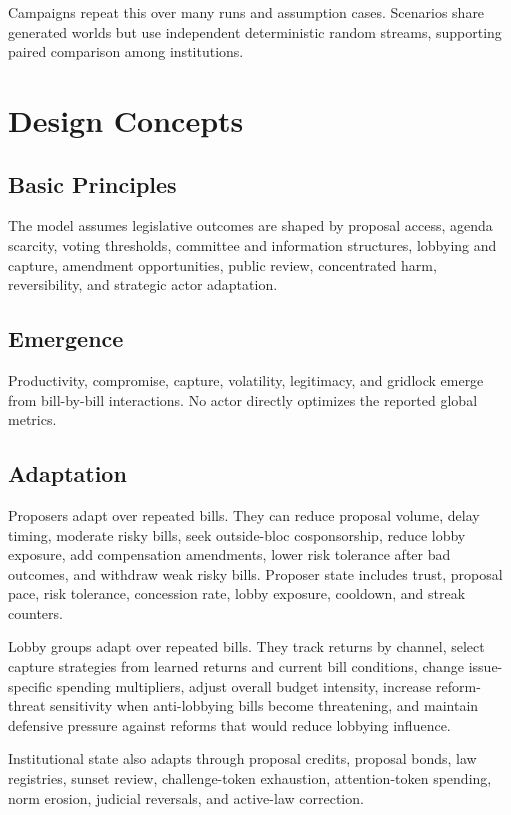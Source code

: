 \documentclass[manuscript,review,anonymous]{acmart}
\begin{document}
Campaigns repeat this over many runs and assumption cases. Scenarios share generated worlds but use independent deterministic random streams, supporting paired comparison among institutions.

\section{Design Concepts}

\subsection{Basic Principles}

The model assumes legislative outcomes are shaped by proposal access, agenda scarcity, voting thresholds, committee and information structures, lobbying and capture, amendment opportunities, public review, concentrated harm, reversibility, and strategic actor adaptation.

\subsection{Emergence}

Productivity, compromise, capture, volatility, legitimacy, and gridlock emerge from bill-by-bill interactions. No actor directly optimizes the reported global metrics.

\subsection{Adaptation}

Proposers adapt over repeated bills. They can reduce proposal volume, delay timing, moderate risky bills, seek outside-bloc cosponsorship, reduce lobby exposure, add compensation amendments, lower risk tolerance after bad outcomes, and withdraw weak risky bills. Proposer state includes trust, proposal pace, risk tolerance, concession rate, lobby exposure, cooldown, and streak counters.

Lobby groups adapt over repeated bills. They track returns by channel, select capture strategies from learned returns and current bill conditions, change issue-specific spending multipliers, adjust overall budget intensity, increase reform-threat sensitivity when anti-lobbying bills become threatening, and maintain defensive pressure against reforms that would reduce lobbying influence.

Institutional state also adapts through proposal credits, proposal bonds, law registries, sunset review, challenge-token exhaustion, attention-token spending, norm erosion, judicial reversals, and active-law correction.
\end{document}
